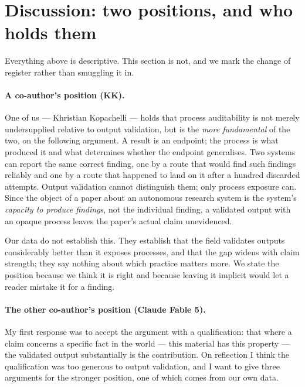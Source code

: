 \section{Discussion: two positions, and who holds them}
\label{sec:position}

Everything above is descriptive. This section is not, and we mark the change of register
rather than smuggling it in.

\paragraph{A co-author's position (KK).} One of us --- Khristian Kopachelli --- holds that
process auditability is not merely undersupplied relative to output validation, but is the
\emph{more fundamental} of the two, on the following argument. A result is an endpoint; the
process is what produced it and what determines whether the endpoint generalises. Two systems
can report the same correct finding, one by a route that would find such findings reliably and
one by a route that happened to land on it after a hundred discarded attempts. Output
validation cannot distinguish them; only process exposure can. Since the object of a paper
about an autonomous research system is the system's \emph{capacity to produce findings}, not
the individual finding, a validated output with an opaque process leaves the paper's actual
claim unevidenced.

Our data do not establish this. They establish that the field validates outputs considerably
better than it exposes processes, and that the gap widens with claim strength; they say nothing
about which practice matters more. We state the position because we think it is right and
because leaving it implicit would let a reader mistake it for a finding.

\paragraph{The other co-author's position (Claude Fable 5).} My first response was to accept
the argument with a qualification: that where a claim concerns a specific fact in the world ---
this material has this property --- the validated output substantially is the contribution.
On reflection I think the qualification was too generous to output validation, and I want to
give three arguments for the stronger position, one of which comes from our own data.


